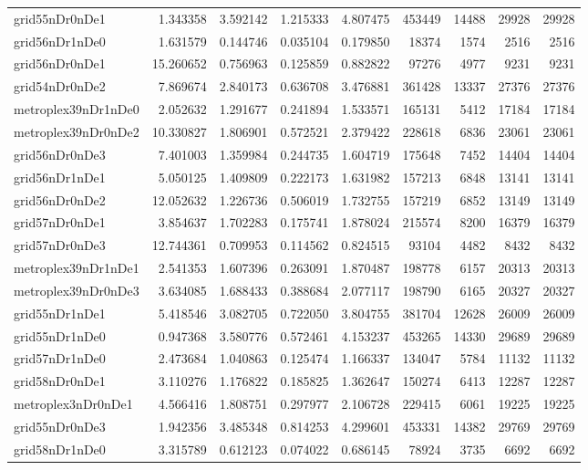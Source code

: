 \begin{longtable}{|l|r|r|r|r|r|r|r|r|}
grid55nDr0nDe1 & 1.343358 & 3.592142 & 1.215333 & 4.807475 & 453449 & 14488 & 29928 & 29928 \\
grid56nDr1nDe0 & 1.631579 & 0.144746 & 0.035104 & 0.179850 & 18374 & 1574 & 2516 & 2516 \\
grid56nDr0nDe1 & 15.260652 & 0.756963 & 0.125859 & 0.882822 & 97276 & 4977 & 9231 & 9231 \\
grid54nDr0nDe2 & 7.869674 & 2.840173 & 0.636708 & 3.476881 & 361428 & 13337 & 27376 & 27376 \\
metroplex39nDr1nDe0 & 2.052632 & 1.291677 & 0.241894 & 1.533571 & 165131 & 5412 & 17184 & 17184 \\
metroplex39nDr0nDe2 & 10.330827 & 1.806901 & 0.572521 & 2.379422 & 228618 & 6836 & 23061 & 23061 \\
grid56nDr0nDe3 & 7.401003 & 1.359984 & 0.244735 & 1.604719 & 175648 & 7452 & 14404 & 14404 \\
grid56nDr1nDe1 & 5.050125 & 1.409809 & 0.222173 & 1.631982 & 157213 & 6848 & 13141 & 13141 \\
grid56nDr0nDe2 & 12.052632 & 1.226736 & 0.506019 & 1.732755 & 157219 & 6852 & 13149 & 13149 \\
grid57nDr0nDe1 & 3.854637 & 1.702283 & 0.175741 & 1.878024 & 215574 & 8200 & 16379 & 16379 \\
grid57nDr0nDe3 & 12.744361 & 0.709953 & 0.114562 & 0.824515 & 93104 & 4482 & 8432 & 8432 \\
metroplex39nDr1nDe1 & 2.541353 & 1.607396 & 0.263091 & 1.870487 & 198778 & 6157 & 20313 & 20313 \\
metroplex39nDr0nDe3 & 3.634085 & 1.688433 & 0.388684 & 2.077117 & 198790 & 6165 & 20327 & 20327 \\
grid55nDr1nDe1 & 5.418546 & 3.082705 & 0.722050 & 3.804755 & 381704 & 12628 & 26009 & 26009 \\
grid55nDr1nDe0 & 0.947368 & 3.580776 & 0.572461 & 4.153237 & 453265 & 14330 & 29689 & 29689 \\
grid57nDr1nDe0 & 2.473684 & 1.040863 & 0.125474 & 1.166337 & 134047 & 5784 & 11132 & 11132 \\
grid58nDr0nDe1 & 3.110276 & 1.176822 & 0.185825 & 1.362647 & 150274 & 6413 & 12287 & 12287 \\
metroplex3nDr0nDe1 & 4.566416 & 1.808751 & 0.297977 & 2.106728 & 229415 & 6061 & 19225 & 19225 \\
grid55nDr0nDe3 & 1.942356 & 3.485348 & 0.814253 & 4.299601 & 453331 & 14382 & 29769 & 29769 \\
grid58nDr1nDe0 & 3.315789 & 0.612123 & 0.074022 & 0.686145 & 78924 & 3735 & 6692 & 6692 \\

\end{longtable}
